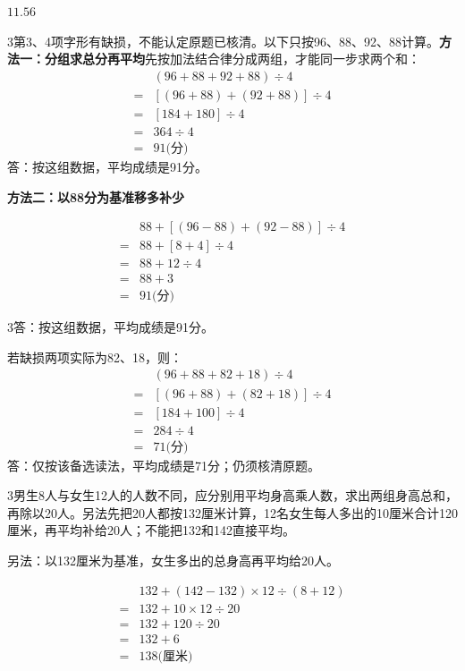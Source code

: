 \documentclass[multi=snippet,border={5bp 20bp 5bp 5bp}]{standalone}
\newenvironment{snippet}[3]{\begin{minipage}{#1bp}\color{answerred}\fontsize{#2}{#3}\selectfont\raggedright}{\end{minipage}}
\begin{document}
\begin{snippet}{34.25}{10}{14}\SourceSans\setlength{\mathindent}{2bp}\(11.56\)\end{snippet}
\begin{snippet}{505}{11.5}{14}\begin{multicols}{3}\raggedcolumns 第3、4项字形有缺损，不能认定原题已核清。以下只按96、88、92、88计算。\textbf{方法一：分组求总分再平均}先按加法结合律分成两组，才能同一步求两个和：\[\begin{aligned}&(96+88+92+88)\div4\\={}&[(96+88)+(92+88)]\div4\\={}&[184+180]\div4\\={}&364\div4\\={}&91\text{(分)}\end{aligned}\]答：按这组数据，平均成绩是91分。\par\textbf{方法二：以88分为基准移多补少}\end{multicols}\[\begin{aligned}&88+[(96-88)+(92-88)]\div4\\={}&88+[8+4]\div4\\={}&88+12\div4\\={}&88+3\\={}&91\text{(分)}\end{aligned}\]\begin{multicols}{3}\raggedcolumns 答：按这组数据，平均成绩是91分。\par 若缺损两项实际为82、18，则：\[\begin{aligned}&(96+88+82+18)\div4\\={}&[(96+88)+(82+18)]\div4\\={}&[184+100]\div4\\={}&284\div4\\={}&71\text{(分)}\end{aligned}\]答：仅按该备选读法，平均成绩是71分；仍须核清原题。\end{multicols}\end{snippet}
\begin{snippet}{505}{11.5}{14}\begin{multicols}{3}\raggedcolumns 男生8人与女生12人的人数不同，应分别用平均身高乘人数，求出两组身高总和，再除以20人。另法先把20人都按132厘米计算，12名女生每人多出的10厘米合计120厘米，再平均补给20人；不能把132和142直接平均。\par 另法：以132厘米为基准，女生多出的总身高再平均给20人。\end{multicols}\[\begin{aligned} &132+(142-132)\times12\div(8+12)\\={}&132+10\times12\div20\\={}&132+120\div20\\={}&132+6\\={}&138\text{(厘米)}\end{aligned}\]\end{snippet}
\end{document}
